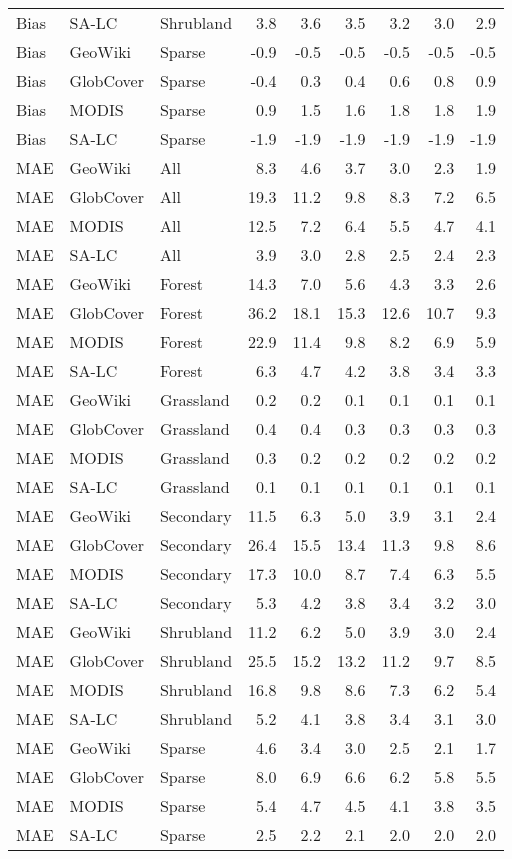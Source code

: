 \begin{longtable}{lllrrrrrr}
  Bias & SA-LC & Shrubland & 3.8 & 3.6 & 3.5 & 3.2 & 3.0 & 2.9 \\ 
  Bias & GeoWiki & Sparse & -0.9 & -0.5 & -0.5 & -0.5 & -0.5 & -0.5 \\ 
  Bias & GlobCover & Sparse & -0.4 & 0.3 & 0.4 & 0.6 & 0.8 & 0.9 \\ 
  Bias & MODIS & Sparse & 0.9 & 1.5 & 1.6 & 1.8 & 1.8 & 1.9 \\ 
  Bias & SA-LC & Sparse & -1.9 & -1.9 & -1.9 & -1.9 & -1.9 & -1.9 \\ 
  MAE & GeoWiki & All & 8.3 & 4.6 & 3.7 & 3.0 & 2.3 & 1.9 \\ 
  MAE & GlobCover & All & 19.3 & 11.2 & 9.8 & 8.3 & 7.2 & 6.5 \\ 
  MAE & MODIS & All & 12.5 & 7.2 & 6.4 & 5.5 & 4.7 & 4.1 \\ 
  MAE & SA-LC & All & 3.9 & 3.0 & 2.8 & 2.5 & 2.4 & 2.3 \\ 
  MAE & GeoWiki & Forest & 14.3 & 7.0 & 5.6 & 4.3 & 3.3 & 2.6 \\ 
  MAE & GlobCover & Forest & 36.2 & 18.1 & 15.3 & 12.6 & 10.7 & 9.3 \\ 
  MAE & MODIS & Forest & 22.9 & 11.4 & 9.8 & 8.2 & 6.9 & 5.9 \\ 
  MAE & SA-LC & Forest & 6.3 & 4.7 & 4.2 & 3.8 & 3.4 & 3.3 \\ 
  MAE & GeoWiki & Grassland & 0.2 & 0.2 & 0.1 & 0.1 & 0.1 & 0.1 \\ 
  MAE & GlobCover & Grassland & 0.4 & 0.4 & 0.3 & 0.3 & 0.3 & 0.3 \\ 
  MAE & MODIS & Grassland & 0.3 & 0.2 & 0.2 & 0.2 & 0.2 & 0.2 \\ 
  MAE & SA-LC & Grassland & 0.1 & 0.1 & 0.1 & 0.1 & 0.1 & 0.1 \\ 
  MAE & GeoWiki & Secondary & 11.5 & 6.3 & 5.0 & 3.9 & 3.1 & 2.4 \\ 
  MAE & GlobCover & Secondary & 26.4 & 15.5 & 13.4 & 11.3 & 9.8 & 8.6 \\ 
  MAE & MODIS & Secondary & 17.3 & 10.0 & 8.7 & 7.4 & 6.3 & 5.5 \\ 
  MAE & SA-LC & Secondary & 5.3 & 4.2 & 3.8 & 3.4 & 3.2 & 3.0 \\ 
  MAE & GeoWiki & Shrubland & 11.2 & 6.2 & 5.0 & 3.9 & 3.0 & 2.4 \\ 
  MAE & GlobCover & Shrubland & 25.5 & 15.2 & 13.2 & 11.2 & 9.7 & 8.5 \\ 
  MAE & MODIS & Shrubland & 16.8 & 9.8 & 8.6 & 7.3 & 6.2 & 5.4 \\ 
  MAE & SA-LC & Shrubland & 5.2 & 4.1 & 3.8 & 3.4 & 3.1 & 3.0 \\ 
  MAE & GeoWiki & Sparse & 4.6 & 3.4 & 3.0 & 2.5 & 2.1 & 1.7 \\ 
  MAE & GlobCover & Sparse & 8.0 & 6.9 & 6.6 & 6.2 & 5.8 & 5.5 \\ 
  MAE & MODIS & Sparse & 5.4 & 4.7 & 4.5 & 4.1 & 3.8 & 3.5 \\ 
  MAE & SA-LC & Sparse & 2.5 & 2.2 & 2.1 & 2.0 & 2.0 & 2.0 \\ 
   \hline
\hline
\end{longtable}
